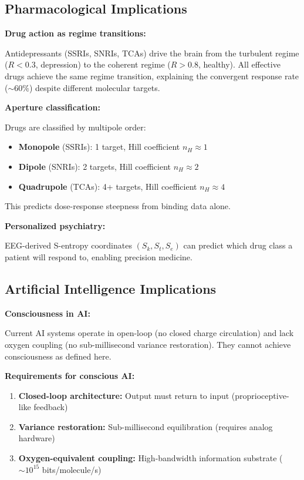 \documentclass[12pt,a4paper]{article}
\begin{document}
\subsection{Pharmacological Implications}

\textbf{Drug action as regime transitions:}

Antidepressants (SSRIs, SNRIs, TCAs) drive the brain from the turbulent regime ($R < 0.3$, depression) to the coherent regime ($R > 0.8$, healthy). All effective drugs achieve the same regime transition, explaining the convergent response rate ($\sim 60\%$) despite different molecular targets.

\textbf{Aperture classification:}

Drugs are classified by multipole order:
\begin{itemize}
\item \textbf{Monopole} (SSRIs): 1 target, Hill coefficient $n_H \approx 1$
\item \textbf{Dipole} (SNRIs): 2 targets, Hill coefficient $n_H \approx 2$
\item \textbf{Quadrupole} (TCAs): 4+ targets, Hill coefficient $n_H \approx 4$
\end{itemize}

This predicts dose-response steepness from binding data alone.

\textbf{Personalized psychiatry:}

EEG-derived S-entropy coordinates $(S_k, S_t, S_e)$ can predict which drug class a patient will respond to, enabling precision medicine.

\subsection{Artificial Intelligence Implications}

\textbf{Consciousness in AI:}

Current AI systems operate in open-loop (no closed charge circulation) and lack oxygen coupling (no sub-millisecond variance restoration). They cannot achieve consciousness as defined here.

\textbf{Requirements for conscious AI:}
\begin{enumerate}
\item \textbf{Closed-loop architecture:} Output must return to input (proprioceptive-like feedback)
\item \textbf{Variance restoration:} Sub-millisecond equilibration (requires analog hardware)
\item \textbf{Oxygen-equivalent coupling:} High-bandwidth information substrate ($\sim 10^{15}$ bits/molecule/s)
\end{enumerate}
\end{document}
